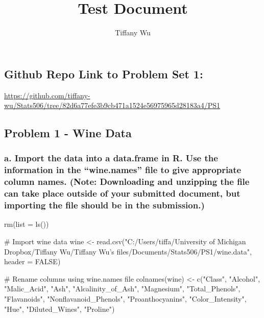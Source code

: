 \documentclass[
  letterpaper,
  DIV=11,
  numbers=noendperiod]{scrartcl}
\title{Test Document}
\author{Tiffany Wu}
\date{}
\newenvironment{Shaded}{\begin{snugshade}}{\end{snugshade}}
\newcommand{\AttributeTok}[1]{\textcolor[rgb]{0.40,0.45,0.13}{#1}}
\newcommand{\CommentTok}[1]{\textcolor[rgb]{0.37,0.37,0.37}{#1}}
\newcommand{\ConstantTok}[1]{\textcolor[rgb]{0.56,0.35,0.01}{#1}}
\newcommand{\FunctionTok}[1]{\textcolor[rgb]{0.28,0.35,0.67}{#1}}
\newcommand{\NormalTok}[1]{\textcolor[rgb]{0.00,0.23,0.31}{#1}}
\newcommand{\OtherTok}[1]{\textcolor[rgb]{0.00,0.23,0.31}{#1}}
\newcommand{\StringTok}[1]{\textcolor[rgb]{0.13,0.47,0.30}{#1}}
\begin{document}
\maketitle

\subsection{Github Repo Link to Problem Set
1:}\label{github-repo-link-to-problem-set-1}

\url{https://github.com/tiffany-wu/Stats506/tree/82d6a77efe3b9cb471a1524e56975965d28183a4/PS1}

\subsection{Problem 1 - Wine Data}\label{problem-1---wine-data}

\subsubsection{a. Import the data into a data.frame in R. Use the
information in the ``wine.names'' file to give appropriate column names.
(Note: Downloading and unzipping the file can take place outside of your
submitted document, but importing the file should be in the
submission.)}\label{a.-import-the-data-into-a-data.frame-in-r.-use-the-information-in-the-wine.names-file-to-give-appropriate-column-names.-note-downloading-and-unzipping-the-file-can-take-place-outside-of-your-submitted-document-but-importing-the-file-should-be-in-the-submission.}

\begin{Shaded}
\begin{Highlighting}[]
\FunctionTok{rm}\NormalTok{(}\AttributeTok{list =} \FunctionTok{ls}\NormalTok{())}

\CommentTok{\# Import wine data}
\NormalTok{wine }\OtherTok{\textless{}{-}} \FunctionTok{read.csv}\NormalTok{(}\StringTok{"C:/Users/tiffa/University of Michigan Dropbox/Tiffany Wu/Tiffany Wu’s files/Documents/Stats506/PS1/wine.data"}\NormalTok{,}
                 \AttributeTok{header =} \ConstantTok{FALSE}\NormalTok{)}

\CommentTok{\# Rename columns using wine.names file}
\FunctionTok{colnames}\NormalTok{(wine) }\OtherTok{\textless{}{-}} \FunctionTok{c}\NormalTok{(}\StringTok{"Class"}\NormalTok{, }\StringTok{"Alcohol"}\NormalTok{, }\StringTok{"Malic\_Acid"}\NormalTok{, }\StringTok{"Ash"}\NormalTok{, }
                    \StringTok{"Alcalinity\_of\_Ash"}\NormalTok{, }\StringTok{"Magnesium"}\NormalTok{, }\StringTok{"Total\_Phenols"}\NormalTok{, }
                    \StringTok{"Flavanoids"}\NormalTok{, }\StringTok{"Nonflavanoid\_Phenols"}\NormalTok{, }
                    \StringTok{"Proanthocyanins"}\NormalTok{, }\StringTok{"Color\_Intensity"}\NormalTok{, }\StringTok{"Hue"}\NormalTok{, }
                    \StringTok{"Diluted\_Wines"}\NormalTok{, }\StringTok{"Proline"}\NormalTok{)}
\end{Highlighting}
\end{Shaded}
\end{document}
